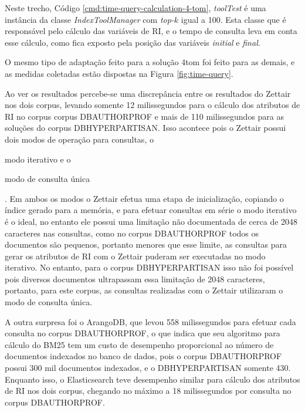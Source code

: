 			Neste trecho, Código \ref{cmd:time-query-calculation-4-tom}, \textit{toolTest} é uma instância da classe \textit{IndexToolManager} com \textit{top-$k$} igual a 100. 
			Esta classe que é responsável pelo cálculo das variáveis de RI, e o tempo de consulta leva em conta esse cálculo, como fica exposto pela posição das variáveis \textit{initial} e \textit{final}.

			O mesmo tipo de adaptação feito para a solução 4\underscore{}tom foi feito para as demais, e as medidas coletadas estão dispostas na Figura \ref{fig:time-query}.

			


			Ao ver os resultados percebe-se uma discrepância entre os resultados do Zettair nos dois corpus, levando somente 12 milissegundos para o cálculo dos atributos de RI no corpus  corpus DB\underscore{}AUTHORPROF e mais de 110 milissegundos para as soluções do corpus DB\underscore{}HYPERPARTISAN.
			Isso acontece pois o Zettair possui dois modos de operação para consultas, o 
			\begin{enumerate*}[label=(\alph*)]
				\item modo iterativo e o 
				\item modo de consulta única
			\end{enumerate*}.
			Em ambos os modos o Zettair efetua uma etapa de inicialização, copiando o índice gerado para a memória, e para efetuar consultas em série o modo iterativo é o ideal, no entanto ele possui uma limitação não documentada de cerca de 2048 caracteres nas consultas, como no corpus DB\underscore{}AUTHORPROF todos os documentos são pequenos, portanto menores que esse limite, as consultas para gerar os atributos de RI com o Zettair puderam ser executadas no modo iterativo.
			No entanto, para o corpus DB\underscore{}HYPERPARTISAN isso não foi possível pois diversos  documentos ultrapassam essa limitação de 2048 caracteres, portanto, para este corpus, as consultas realizadas com o Zettair utilizaram o modo de consulta única.

			A outra surpresa foi o ArangoDB, que levou 558 milissegundos para efetuar cada consulta no corpus DB\underscore{}AUTHORPROF, o que indica que seu algoritmo para cálculo do BM25 tem um custo de desempenho proporcional ao número de documentos indexados no banco de dados, pois o corpus DB\underscore{}AUTHORPROF possui 300 mil documentos indexados, e o DB\underscore{}HYPERPARTISAN somente 430.
			Enquanto isso, o Elasticsearch teve desempenho similar para cálculo dos atributos de RI nos dois corpus, chegando no máximo a 18 milissegundos por consulta no corpus DB\underscore{}AUTHORPROF.

